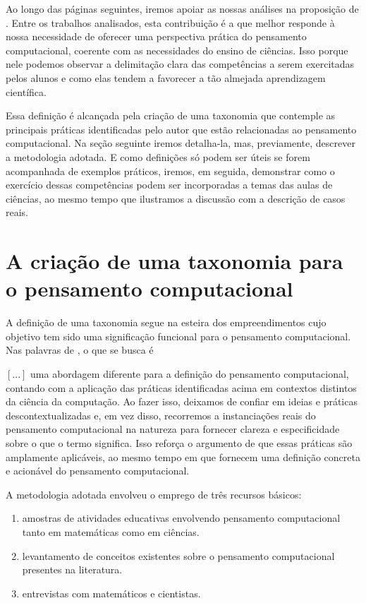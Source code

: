 Ao longo das páginas seguintes, iremos apoiar as nossas análises na proposição de . Entre os trabalhos analisados, esta contribuição é a que melhor responde à nossa necessidade de oferecer uma perspectiva prática do pensamento computacional, coerente com as necessidades do ensino de ciências. Isso porque nele podemos observar a delimitação clara das competências a serem exercitadas pelos alunos e como elas tendem a favorecer a tão almejada aprendizagem científica.

Essa definição é alcançada pela criação de uma taxonomia que contemple as principais práticas identificadas pelo autor que estão relacionadas ao pensamento computacional. Na seção seguinte iremos detalha-la, mas, previamente, descrever a metodologia adotada. E como definições só podem ser úteis se forem acompanhada de exemplos práticos, iremos, em seguida, demonstrar como o exercício dessas competências podem ser incorporadas a temas das aulas de ciências, ao mesmo tempo que ilustramos a discussão com a descrição de casos reais.

\section{A criação de uma taxonomia para o pensamento computacional}

A definição de uma taxonomia segue na esteira dos empreendimentos cujo objetivo tem sido uma significação funcional para o pensamento computacional. Nas palavras de , o que se busca é 

\begin{citacao}
$[...]$ uma abordagem diferente para a definição do pensamento computacional, contando com a aplicação das práticas identificadas acima em contextos distintos da ciência da computação. Ao fazer isso, deixamos de confiar em ideias e práticas descontextualizadas e, em vez disso, recorremos a instanciações reais do pensamento computacional na natureza para fornecer clareza e especificidade sobre o que o termo significa. Isso reforça o argumento de que essas práticas são amplamente aplicáveis, ao mesmo tempo em que fornecem uma definição concreta e acionável do pensamento computacional. \cite[Tradução nossa]{Weintrop2016}
\end{citacao}

A metodologia adotada envolveu o emprego de três recursos básicos:

\begin{enumerate}
  \item amostras de atividades educativas envolvendo pensamento computacional tanto em matemáticas como em ciências.
  \item levantamento de conceitos existentes sobre o pensamento computacional presentes na literatura.
  \item entrevistas com matemáticos e cientistas.
\end{enumerate}

